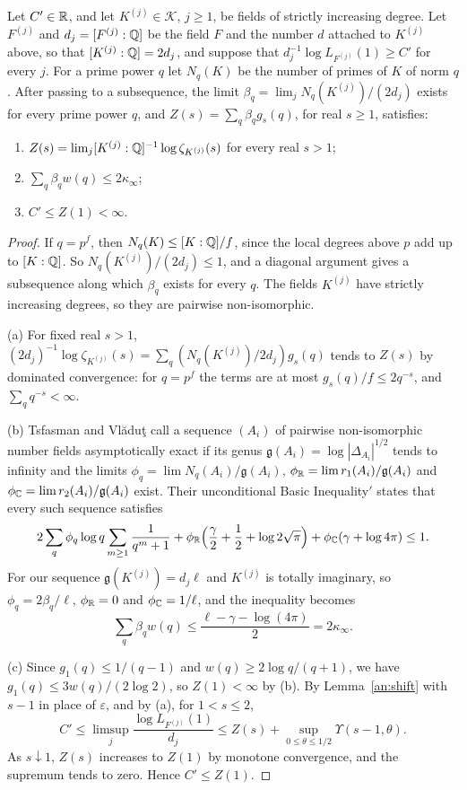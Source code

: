 \begin{lemma}\label{an:limit}
Let $C'\in\mathbb R$, and let $K^{(j)}\in\mathcal K$, $j\ge1$, be fields of strictly
increasing degree. Let $F^{(j)}$ and $d_j=[F^{(j)}:\mathbb Q]$ be the field $F$ and
the number $d$ attached to $K^{(j)}$ above, so that $[K^{(j)}:\mathbb Q]=2d_j$, and
suppose that $d_j^{-1}\log L_{F^{(j)}}(1)\ge C'$ for every $j$. For a prime
power $q$ let $N_q(K)$ be the number of
primes of $K$ of norm $q$. After passing to a subsequence, the limit
$\beta_q=\lim_jN_q(K^{(j)})/(2d_j)$ exists for every prime power $q$, and
$Z(s)=\sum_q\beta_qg_s(q)$, for real $s\ge1$, satisfies:
\begin{enumerate}
\item[(a)] $Z(s)=\lim_j[K^{(j)}:\mathbb Q]^{-1}\log\zeta_{K^{(j)}}(s)$ for every
 real $s>1$;
\item[(b)] $\sum_q\beta_qw(q)\le2\kappa_\infty$;
\item[(c)] $C'\le Z(1)<\infty$.
\end{enumerate}
\end{lemma}

\begin{proof}
If $q=p^f$, then $N_q(K)\le[K:\mathbb Q]/f$, since the local degrees above $p$ add
up to $[K:\mathbb Q]$. So $N_q(K^{(j)})/(2d_j)\le1$, and a diagonal argument gives
a subsequence along which $\beta_q$ exists for every $q$. The fields
$K^{(j)}$ have strictly increasing degrees, so they are pairwise
non-isomorphic.

(a) For fixed real $s>1$,
$(2d_j)^{-1}\log\zeta_{K^{(j)}}(s)=\sum_q(N_q(K^{(j)})/2d_j)g_s(q)$ tends to
$Z(s)$ by dominated convergence: for $q=p^f$ the terms are at most
$g_s(q)/f\le2q^{-s}$, and $\sum_qq^{-s}<\infty$.

(b) Tsfasman and Vl\u{a}du\c{t} call a sequence $(A_i)$ of pairwise
non-isomorphic number fields asymptotically exact if its genus
$\mathfrak g(A_i)=\log|\Delta_{A_i}|^{1/2}$ tends to infinity and the limits
$\phi_q=\lim N_q(A_i)/\mathfrak g(A_i)$,
$\phi_\mathbb R=\lim r_1(A_i)/\mathfrak g(A_i)$ and
$\phi_\mathbb C=\lim r_2(A_i)/\mathfrak g(A_i)$ exist. Their unconditional Basic
Inequality$'$ \cite[Section~3.2, Proposition~3.1]{TsfasmanVladut2002} states
that every such sequence satisfies
\[
 2\sum_q\phi_q\log q\sum_{m\ge1}\frac1{q^m+1}
 +\phi_\mathbb R\Bigl(\frac\gamma2+\frac12+\log2\sqrt\pi\Bigr)
 +\phi_\mathbb C(\gamma+\log4\pi)\le1.
\]
For our sequence $\mathfrak g(K^{(j)})=d_j\ell$ and $K^{(j)}$ is totally
imaginary, so $\phi_q=2\beta_q/\ell$, $\phi_\mathbb R=0$ and $\phi_\mathbb C=1/\ell$, and
the inequality becomes
\begin{equation}\label{an:tv-budget}
 \sum_q\beta_qw(q)\le\frac{\ell-\gamma-\log(4\pi)}2=2\kappa_\infty.
\end{equation}

(c) Since $g_1(q)\le1/(q-1)$ and $w(q)\ge2\log q/(q+1)$, we have
$g_1(q)\le3w(q)/(2\log2)$, so $Z(1)<\infty$ by (b). By
Lemma~\ref{an:shift} with $s-1$ in place of $\varepsilon$, and by (a), for
$1<s\le2$,
\[
 C'\le\limsup_j\frac{\log L_{F^{(j)}}(1)}{d_j}
 \le Z(s)+\sup_{0\le\theta\le1/2}\Upsilon(s-1,\theta).
\]
As $s\downarrow1$, $Z(s)$ increases to $Z(1)$ by monotone convergence, and
the supremum tends to zero. Hence $C'\le Z(1)$.
\end{proof}

